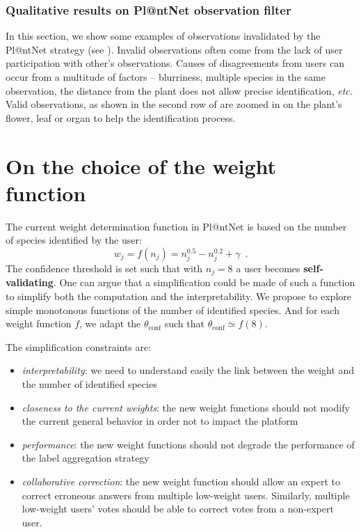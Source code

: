 \subsubsection{Qualitative results on Pl@ntNet observation filter}

In this section, we show some examples of observations invalidated by the Pl@ntNet strategy (see ).
Invalid observations often come from the lack of user participation with other's observations.
Causes of disagreements from users can occur from a multitude of factors -- blurriness, multiple species in the same observation, the distance from the plant does not allow precise identification, \emph{etc.}
Valid observations, as shown in the second row of  are zoomed in on the plant's flower, leaf or organ to help the identification process.

\section{On the choice of the weight function}

The current weight determination function in Pl@ntNet is based on the number of species identified by the user:
\begin{equation}
    w_j = f(n_j) = n_j^{0.5} - n_j^{0.2} + \gamma \enspace.
\end{equation}
The confidence threshold is set such that with $n_j=8$ a user becomes \textbf{self-validating}.
One can argue that a simplification could be made of such a function to simplify both the computation and the interpretability.
We propose to explore simple monotonous functions of the number of identified species.
And for each weight function $f$, we adapt the $\theta_\mathrm{conf}$ such that $\theta_\mathrm{conf} \simeq f(8)$.


The simplification constraints are:
\begin{itemize}
    \item \emph{interpretability}: we need to understand easily the link between the weight and the number of identified species
    \item \emph{closeness to the current weights}: the new weight functions should not modify the current general behavior in order not to impact the platform
    \item \emph{performance}: the new weight functions should not degrade the performance of the label aggregation strategy
    \item \emph{collaborative correction}: the new weight function should allow an expert to correct erroneous answers from multiple low-weight users. Similarly, multiple low-weight users' votes should be able to correct votes from a non-expert user.
\end{itemize}

